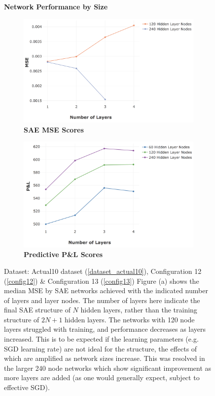 \documentclass[a4paper,11pt,oneside]{article}
\theoremstyle{plain}
\theoremstyle{definition}
\begin{document}
	\begin{figure}[H]
		\centering
		\textbf{Network Performance by Size}
		\begin{subfigure}{.99\textwidth}
			\centering 
			\includegraphics[scale=0.4]{images/results/8_7_network/actual_mse_lines.png}
			\caption{\textbf{SAE MSE Scores} 
				\newline }
			\label{figure-actual_mse_lines}
		\end{subfigure}
		\begin{subfigure}{.99\textwidth}
			\centering 
			\includegraphics[scale=0.4]{images/results/8_7_network/actual_pl_lines.png}
			\caption{\textbf{Predictive P\&L Scores} 
				\newline }
			\label{figure-actual_pl_lines}
		\end{subfigure}
		\caption[Network Performance by Size]
		{Dataset: Actual10 dataset (\ref{dataset_actual10}), Configuration 12 (\ref{config12}) \& Configuration 13 (\ref{config13})
			\newline Figure (a) shows the median MSE by SAE networks achieved with the indicated number of layers and layer nodes. The number of layers here indicate the final SAE structure of $N$ hidden layers, rather than the training structure of $2N + 1$ hidden layers. The networks with 120 node layers struggled with training, and performance decreases as layers increased. This is to be expected if the learning parameters (e.g. SGD  learning rate) are not ideal for the structure, the effects of which are amplified as network sizes increase. This was resolved in the larger 240 node networks which show significant improvement as more layers are added (as one would generally expect, subject to effective SGD).
}
\end{figure}
\end{document}
